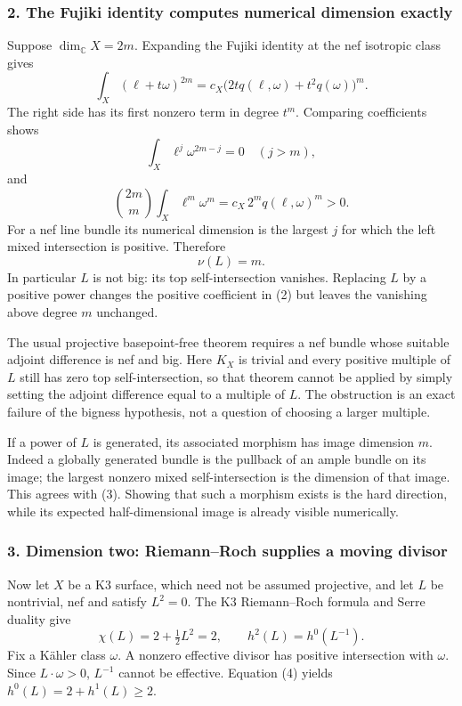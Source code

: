 \documentclass[11pt]{article}
\begin{document}
\subsubsection{2. The Fujiki identity computes numerical dimension exactly}
Suppose $\dim_\mathbb C X=2m$. Expanding the Fujiki identity at the nef isotropic class gives
\[
 \int_X(\ell+t\omega)^{2m}
 =c_X\bigl(2tq(\ell,\omega)+t^2q(\omega)\bigr)^m.      \tag{1}
\]
The right side has its first nonzero term in degree $t^m$. Comparing coefficients shows
\[
 \int_X\ell^j\omega^{2m-j}=0\quad(j>m),
\]
and
\[
 \binom{2m}{m}\int_X\ell^m\omega^m
 =c_X\,2^m q(\ell,\omega)^m>0.                         \tag{2}
\]
For a nef line bundle its numerical dimension is the largest $j$ for which the left mixed intersection is positive. Therefore
\[
 \nu(L)=m.                                            \tag{3}
\]
In particular $L$ is not big: its top self-intersection vanishes. Replacing $L$ by a positive power changes the positive coefficient in (2) but leaves the vanishing above degree $m$ unchanged.

The usual projective basepoint-free theorem requires a nef bundle whose suitable adjoint difference is nef and big. Here $K_X$ is trivial and every positive multiple of $L$ still has zero top self-intersection, so that theorem cannot be applied by simply setting the adjoint difference equal to a multiple of $L$. The obstruction is an exact failure of the bigness hypothesis, not a question of choosing a larger multiple.

If a power of $L$ is generated, its associated morphism has image dimension $m$. Indeed a globally generated bundle is the pullback of an ample bundle on its image; the largest nonzero mixed self-intersection is the dimension of that image. This agrees with (3). Showing that such a morphism exists is the hard direction, while its expected half-dimensional image is already visible numerically.

\subsubsection{3. Dimension two: Riemann--Roch supplies a moving divisor}
Now let $X$ be a K3 surface, which need not be assumed projective, and let $L$ be nontrivial, nef and satisfy $L^2=0$. The K3 Riemann--Roch formula and Serre duality give
\[
 \chi(L)=2+\tfrac12L^2=2,
 \qquad h^2(L)=h^0(L^{-1}).                            \tag{4}
\]
Fix a K\"ahler class $\omega$. A nonzero effective divisor has positive intersection with $\omega$. Since $L\cdot\omega>0$, $L^{-1}$ cannot be effective. Equation (4) yields $h^0(L)=2+h^1(L)\ge2$.
\end{document}
